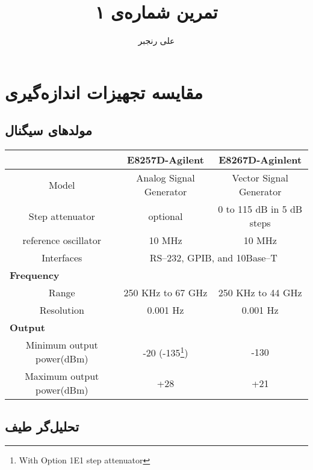 \documentclass[logo=images/logo.png]{tehranReport}
\title{تمرین شماره‌ی ۱}
\author{علی رنجبر}
\begin{document}
    \maketitlepage

    \section*{مقایسه تجهیزات اندازه‌گیری}
    

    \subsection*{مولدهای سیگنال}
	
	\begin{center}
		\begin{latin}
			\begin{tabular}{|c || c c|}
				\cline{2-3}
				\multicolumn{1}{c}{}&\multicolumn{1}{|c}{\textbf{E8257D-Agilent}}&\multicolumn{1}{c|}{\textbf{E8267D-Aginlent}}\\
				\hline\hline
			    Model & Analog Signal Generator & Vector Signal Generator\\
			    \hline
			    Step attenuator & optional & 0 to 115 dB in 5 dB steps \\ 
			    \hline
			    reference oscillator & 10 MHz & 10 MHz\\
			    \hline
			    Interfaces & \multicolumn{2}{c|}{RS–232, GPIB, and 10Base–T }\\
			    \hline
			    \multicolumn{3}{|l|}{\cellcolor[HTML]{F0F0F0}\textbf{Frequency}}\\
				\hline
				Range & 250 KHz to 67 GHz & 250 KHz to 44 GHz\\
				\hline
				Resolution & 0.001‌ Hz& 0.001 Hz\\
				\hline
				\multicolumn{3}{|l|}{\cellcolor[HTML]{F0F0F0}\textbf{Output}}\\
				\hline
				Minimum output power(dBm) & -20 (-135\footnote{With Option 1E1 step attenuator}) & -130\\
				\hline
				Maximum output power(dBm) & +28 & +21\\
				\hline
			\end{tabular}
		\end{latin}
	\end{center}
	
	\subsection*{تحلیل‌گر طیف}
	
\end{document}
